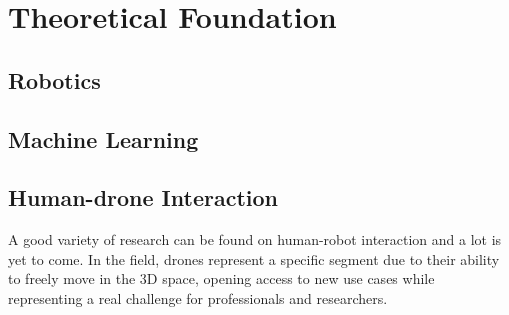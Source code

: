 \chapter{Theoretical Foundation}
\label{chap:theory}




\section{Robotics}
\label{sec:robotics}

%




\section{Machine Learning}
\label{sec:machine-learning}

%
%




\section{Human-drone Interaction}
\label{sec:human-drone-interaction}

A good variety of research can be found on human-robot interaction and a lot is yet to come. In the field, drones represent a specific segment due to their ability to freely move in the 3D space, opening access to new use cases while representing a real challenge for professionals and researchers.

